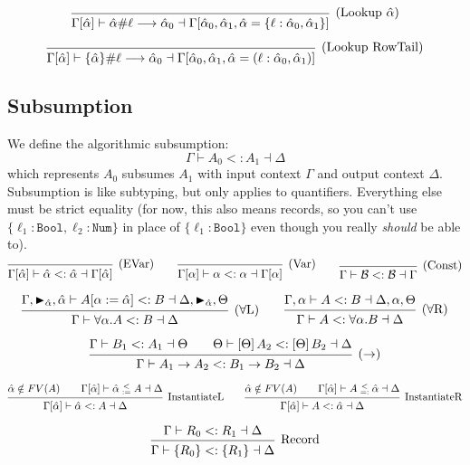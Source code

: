 \documentclass{article}
\newcommand{\B}{\mathcal{B}}
\newcommand{\marker}[1]{\RHD_{#1}}
\newcommand{\subsume}{<:}
\newcommand{\instLSymbol}{\;\substack{<\\:=}\;}
\newcommand{\instRSymbol}{\;\substack{<\\=:}\;}
\newcommand{\ev}{\hat}
\newcommand{\spc}{\qquad}
\newcommand{\apply}[1]{\left[#1\right]}
\newcommand{\subsumes}[4]{#1 \vdash #2 \subsume #3 \dashv #4}
\newcommand{\instL}[4]{#1 \vdash #2 \instLSymbol #3 \dashv #4}
\newcommand{\instR}[4]{#1 \vdash #2 \instRSymbol #3 \dashv #4}
\newcommand{\lookup}[5]{#1 \vdash #2 \# #3 \longrightarrow #4 \dashv #5}
\newcommand{\deduct}[3][]
{
  \begin{prooftree}
    \hypo{#2}
    \infer1[\text{#1}]{#3}
  \end{prooftree}
}
\begin{document}
\[
\deduct[(Lookup \(\ev\alpha\))]
  { }
  { \lookup
      {\Gamma[\ev\alpha]}
      {\ev\alpha}
      {\ell}
      {\ev\alpha_0}
      {\Gamma[\ev\alpha_0, \ev\alpha_1, \ev\alpha = \{\ell : \ev\alpha_0, \ev\alpha_1\}] }
  }
\]

\[
\deduct[(Lookup RowTail)]
  { }
  { \lookup
      {\Gamma[\ev\alpha]}
      {\{\ev\alpha\}}
      {\ell}
      {\ev\alpha_0}
      {\Gamma[\ev\alpha_0, \ev\alpha_1, \ev\alpha = (\ell : \ev\alpha_0, \ev\alpha_1)] }
  }
\]

\subsection{Subsumption}
We define the algorithmic subsumption:
\[
\subsumes{\Gamma}{A_0}{A_1}{\Delta}
\]
which represents $A_0$ subsumes $A_1$ with input context $\Gamma$ and output
context $\Delta$. Subsumption is like subtyping, but only applies to
quantifiers. Everything else must be strict equality (for now, this also means
records, so you can't use \(\{\ell_1: \texttt{Bool}, \ell_2: \texttt{Num}\}\) in
place of \(\{\ell_1 : \texttt{Bool}\}\) even though you really \emph{should} be
able to).
\[
  \deduct[(EVar)]{}{\subsumes{\Gamma[\ev\alpha]}{\ev\alpha}{\ev\alpha}{\Gamma[\ev\alpha]}}
  \spc
  \deduct[(Var)]{}{\subsumes{\Gamma[\alpha]}{\alpha}{\alpha}{\Gamma[\alpha]}}
  \spc
  \deduct[(Const)]{}{\subsumes{\Gamma}{\B}{\B}{\Gamma}}
\]

\[
  \deduct[(\(\forall\)L)]
  { \subsumes{\Gamma, \marker{\ev\alpha}, \ev\alpha}{A[\alpha := \ev\alpha]}{B}{\Delta, \marker{\ev\alpha}, \Theta} }
  { \subsumes{\Gamma}{\forall \alpha. A}{B}{\Delta} }
  \spc
  \deduct[(\(\forall\)R)]
  { \subsumes{\Gamma, \alpha}{A}{B}{\Delta, \alpha, \Theta} }
  { \subsumes{\Gamma}{A}{\forall \alpha. B}{\Delta} }
\]

\[
  \deduct[(\(\to\))]
  { \subsumes{\Gamma}{B_1}{A_1}{\Theta} \spc \subsumes{\Theta}{\apply\Theta A_2}{\apply\Theta B_2}{\Delta} }
  { \subsumes{\Gamma}{A_1 \to A_2}{B_1 \to B_2}{\Delta} }
\]

\[
  \deduct[InstantiateL]
  {\ev \alpha \notin FV(A) \spc \instL{\Gamma[\ev \alpha]}{\ev
      \alpha}{A}{\Delta}}
  {\subsumes{\Gamma[\ev \alpha]}{\ev \alpha}{A}{\Delta}}
  \spc
  \deduct[InstantiateR]
  {\ev \alpha \notin FV(A) \spc \instR{\Gamma[\ev \alpha]}{A}{\ev
      \alpha}{\Delta}}
  {\subsumes{\Gamma[\ev \alpha]}{A}{\ev \alpha}{\Delta}}
\]

\[
  \deduct[Record]{\subsumes{\Gamma}{R_0}{R_1}{\Delta}}{\subsumes{\Gamma}{\{R_0\}}{\{R_1\}}{\Delta}}
\]
\end{document}
